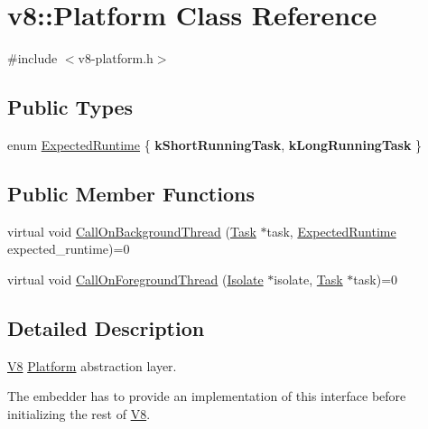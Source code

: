 \hypertarget{classv8_1_1Platform}{\section{v8\-:\-:Platform Class Reference}
\label{classv8_1_1Platform}
}


{\ttfamily \#include $<$v8-\/platform.\-h$>$}

\subsection*{Public Types}
\begin{DoxyCompactItemize}
\item 
enum \hyperlink{classv8_1_1Platform_ace7f666b2b5995bb0e898e12fa660718}{Expected\-Runtime} \{ {\bfseries k\-Short\-Running\-Task}, 
{\bfseries k\-Long\-Running\-Task}
 \}
\end{DoxyCompactItemize}
\subsection*{Public Member Functions}
\begin{DoxyCompactItemize}
\item 
virtual void \hyperlink{classv8_1_1Platform_aa715e6839c1954b4e23b9d2df00bd3ea}{Call\-On\-Background\-Thread} (\hyperlink{classv8_1_1Task}{Task} $\ast$task, \hyperlink{classv8_1_1Platform_ace7f666b2b5995bb0e898e12fa660718}{Expected\-Runtime} expected\-\_\-runtime)=0
\item 
virtual void \hyperlink{classv8_1_1Platform_a8fa13959f919d1d3ff170bceea939915}{Call\-On\-Foreground\-Thread} (\hyperlink{classv8_1_1Isolate}{Isolate} $\ast$isolate, \hyperlink{classv8_1_1Task}{Task} $\ast$task)=0
\end{DoxyCompactItemize}


\subsection{Detailed Description}
\hyperlink{classv8_1_1V8}{V8} \hyperlink{classv8_1_1Platform}{Platform} abstraction layer.

The embedder has to provide an implementation of this interface before initializing the rest of \hyperlink{classv8_1_1V8}{V8}. 

